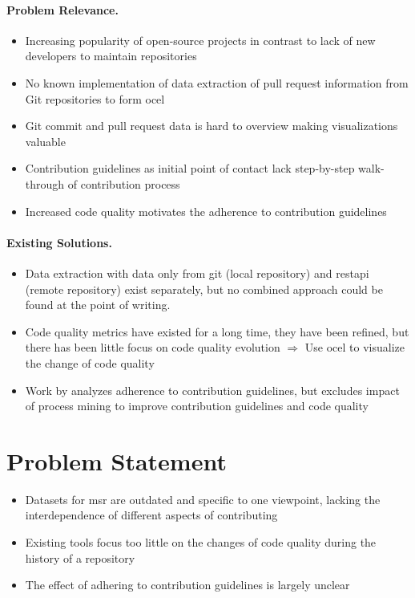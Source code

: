 \paragraph{Problem Relevance.} 
\begin{itemize}
	\item Increasing popularity of open-source projects in contrast to lack of new developers to maintain repositories \autocite{DBLP:journals/corr/abs-2208-04895}\autocite{DBLP:journals/ese/RehmanWKIM22}
	\item No known implementation of data extraction of pull request information from Git repositories to form \ac{ocel}
	\item Git commit and pull request data is hard to overview making visualizations valuable
	\item Contribution guidelines as initial point of contact \autocite{DBLP:conf/icsm/ElazharySEZ19} lack step-by-step walk-through of contribution process
	\item Increased code quality motivates the adherence to contribution guidelines
\end{itemize}

\paragraph{Existing Solutions.}
\begin{itemize}
	\item Data extraction with data only from git (local repository) and \ac{restapi} (remote repository) exist separately, but no combined approach could be found at the point of writing.
	\item Code quality metrics have existed for a long time, they have been refined, but there has been little focus on code quality evolution $\Rightarrow$ Use \ac{ocel} to visualize the change of code quality
	\item Work by \autocite{DBLP:conf/icsm/ElazharySEZ19} analyzes adherence to contribution guidelines, but excludes impact of process mining to improve contribution guidelines and code quality
\end{itemize}


\section{Problem Statement}
\label{sec:intro_ssec:probs}
\begin{itemize}
	\item Datasets for \ac{msr} are outdated and specific to one viewpoint, lacking the interdependence of different aspects of contributing
	\item Existing tools focus too little on the changes of code quality during the history of a repository
	\item The effect of adhering to contribution guidelines is largely unclear
\end{itemize}


